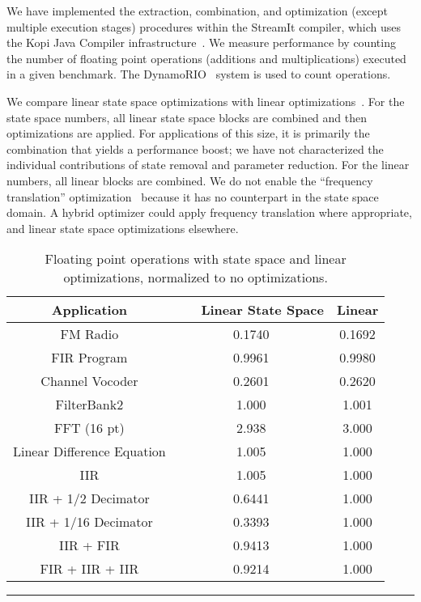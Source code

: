 \vspace{-24pt}
\label{sec:results}

We have implemented the extraction, combination, and optimization
(except multiple execution stages) procedures within the StreamIt
compiler, which uses the Kopi Java Compiler
infrastructure~\cite{kopi}. We measure performance by counting the
number of floating point operations (additions and multiplications)
executed in a given benchmark. The DynamoRIO~\cite{dynamo} system is
used to count operations.

We compare linear state space optimizations with linear
optimizations~\cite{Lamb}.  For the state space numbers, all linear
state space blocks are combined and then optimizations are applied.
For applications of this size, it is primarily the combination that
yields a performance boost; we have not characterized the individual
contributions of state removal and parameter reduction.  For the
linear numbers, all linear blocks are combined.  We do not enable the
``frequency translation'' optimization~\cite{Lamb} because it has no
counterpart in the state space domain.  A hybrid optimizer could apply
frequency translation where appropriate, and linear state space
optimizations elsewhere.

\begin{table}[tbp]
\small
\begin{center}
\begin{tabular} {|c|c|c|} \hline
{\bf Application} & {\bf ~~~Linear State Space} & {\bf Linear} \\ \hline \hline
FM Radio & 0.1740 & 0.1692 \\ \hline
FIR Program &  0.9961 & 0.9980 \\ \hline
Channel Vocoder & 0.2601 & 0.2620 \\ \hline
FilterBank2 & 1.000 & 1.001 \\ \hline
FFT (16 pt) & 2.938 & 3.000 \\ \hline
Linear Difference Equation & 1.005 & 1.000 \\ \hline
IIR & 1.005 & 1.000 \\ \hline
IIR + 1/2 Decimator & 0.6441 & 1.000 \\ \hline
IIR + 1/16 Decimator & 0.3393 & 1.000 \\ \hline
IIR + FIR & 0.9413 & 1.000 \\ \hline
FIR + IIR + IIR & 0.9214 & 1.000 \\ \hline
\end{tabular}
\begin{minipage}{4in}
\caption{Floating point operations with state space and linear
optimizations, normalized to no optimizations.\protect\label{tab:results}}
\end{minipage}
\vspace{6pt}
\hrule
\end{center}
\vspace{-24pt}
\end{table}


